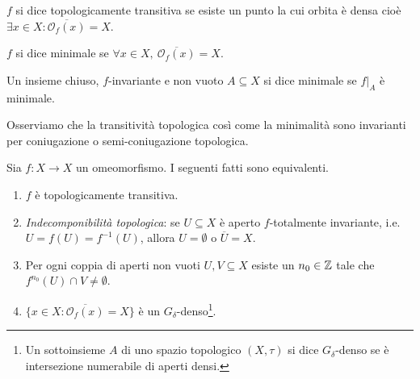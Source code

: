 \begin{definition}
	$ f $ si dice topologicamente transitiva se esiste un punto la cui orbita è densa cioè $ \exists x \in X : \overline{\mathcal{O}_f(x)} = X $.
\end{definition}

\begin{definition}
	$ f $ si dice minimale se $ \forall x \in X, \ \overline{\mathcal{O}_f(x)} = X $. 
\end{definition}

\begin{definition}
	Un insieme chiuso, $ f $-invariante e non vuoto $ A \subseteq X $ si dice minimale se $ f\lvert_A $ è minimale. 
\end{definition}

Osserviamo che la transitività topologica così come la minimalità sono invarianti per coniugazione o semi-coniugazione topologica.

\begin{thm}
	Sia $ f \colon X \to X $ un omeomorfismo. I seguenti fatti sono equivalenti.
	\begin{enumerate}[label=(\roman*)]
		\item $ f $ è topologicamente transitiva.
		\item \emph{Indecomponibilità topologica}: se $ U \subseteq X $ è aperto $ f $-totalmente invariante, i.e. $ U = f(U) = f^{-1}(U) $, allora $ U = \emptyset $ o $ \overline{U} = X $.
		\item Per ogni coppia di aperti non vuoti $ U, V \subseteq X $ esiste un $ n_0 \in \mathbb{Z} $ tale che $ f^{n_0}(U) \cap V \neq \emptyset $. 
		\item $ \{x \in X : \overline{\mathcal{O}_f(x)} = X\} $ è un $ G_\delta $-denso\footnote{%
			Un sottoinsieme $ A $ di uno spazio topologico $ (X, \tau) $ si dice $ G_\delta $-denso se è intersezione numerabile di aperti densi. 
		}.
	\end{enumerate}
\end{thm}

